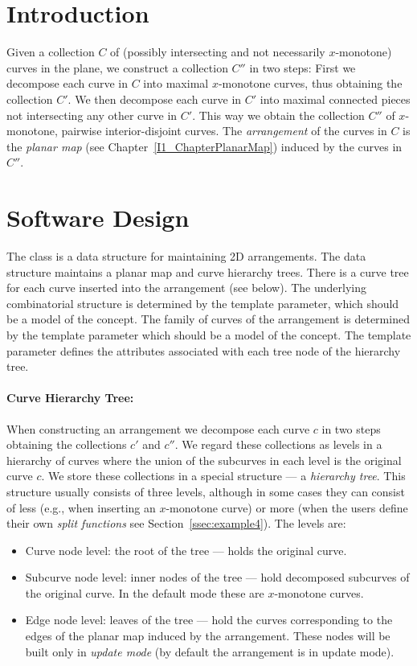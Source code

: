 \section{Introduction}

Given a collection $C$ of (possibly
intersecting and not necessarily $x$-monotone) curves in the plane,
we construct a collection 
$C''$ in two steps: First we decompose each curve in $C$ into maximal
$x$-monotone curves, thus obtaining the collection $C'$. We then
decompose each curve in $C'$ into maximal connected pieces not
intersecting any other curve in $C'$. This way we obtain the
collection $C''$ of $x$-monotone, pairwise interior-disjoint curves.
The {\em arrangement} of the curves in $C$ is the
{\it planar map} (see Chapter~\ref{I1_ChapterPlanarMap})
induced by the curves in $C''$.

\section{Software Design}
 
The class  is a data
structure for maintaining 2D arrangements. The data structure
maintains a planar map and curve hierarchy trees. There is a curve
tree for each curve inserted into the arrangement (see below). The
underlying combinatorial structure is determined by the
 template parameter, which should be a model of the
 concept. The family of curves of the
arrangement is determined by the  template parameter which
should be a model of the  concept. The
 template parameter defines the attributes associated
with each tree node of the hierarchy tree.

\paragraph{Curve Hierarchy Tree:} When constructing an arrangement
we decompose each curve $c$ in two steps obtaining the collections
$c'$ and $c''$. We regard these collections as levels in a hierarchy
of curves where the union of the subcurves in each level is the
original curve $c$. We store these collections in a special structure
--- a {\em hierarchy tree}. This structure usually consists of three
levels, although in some cases they can consist of less (e.g., when
inserting an $x$-monotone curve) or more (when the users define their
own {\em split functions} see Section~\ref{ssec:example4}). The levels
are:
\begin{itemize}
\item Curve node level: the root of the tree --- holds the original curve.
\item Subcurve node level: inner nodes of the tree --- hold decomposed
subcurves of
the original curve. In the default mode these are $x$-monotone curves.
\item Edge node level: leaves of the tree --- hold the curves corresponding to
the edges of the planar map induced by the arrangement. These nodes will
be built only in {\em update mode} (by default the arrangement is in
update mode).
\end{itemize}


